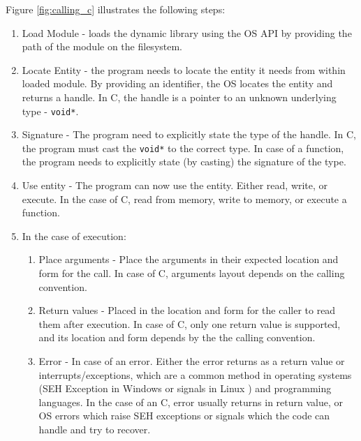 \documentclass[sigplan,10pt,manuscript,nonacm]{acmart}
\begin{document}
Figure \ref{fig:calling_c} illustrates the following steps:
\begin{enumerate}
    \vspace{-2mm}\item Load Module - loads the dynamic library using the OS API by providing the path of the module on the filesystem.
    \vspace{-2mm}\item Locate Entity - the program needs to locate the entity it needs from within loaded module. By providing an identifier, the OS locates the entity and returns a {handle}. In C, the handle is a pointer to an unknown underlying type - \texttt{void*}.
    \vspace{-2mm}\item Signature - The program need to explicitly state the type of the handle. In C, the program must cast the \texttt{void*} to the correct type. In case of a function, the program needs to explicitly state (by casting) the signature of the type.
    \vspace{-2mm}\item Use entity - The program can now use the entity. Either read, write, or execute. In the case of C, read from memory, write to memory, or execute a function.
    \vspace{-2mm}\item In the case of execution:
    \begin{enumerate}
        \vspace{-2mm}\item Place arguments - Place the arguments in their expected location and form for the call. In case of C, arguments layout depends on the calling convention.
        \vspace{-2mm}\item Return values - Placed in the location and form for the caller to read them after execution. In case of C, only one return value is supported, and its location and form depends by the the calling convention.
        \vspace{-2mm}\item Error - In case of an error. Either the error returns as a return value or interrupts/exceptions, which are a common method in operating systems (SEH Exception \cite{seh_exception} in Windows or signals in Linux \cite{unix_signal}) and programming languages. In the case of an C, error usually returns in return value, or OS errors which raise SEH exceptions or signals which the code can handle and try to recover.
    \end{enumerate}    
\end{enumerate}
\end{document}

